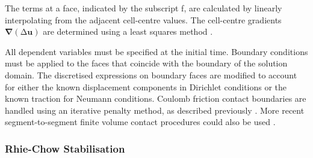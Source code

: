 \documentclass[sn-mathphys,Numbered,draft]{sn-jnl}%
\newcommand{\bb}{\boldsymbol}
\begin{document}
The terms at a face, indicated by the subscript f, are calculated by linearly interpolating from the adjacent cell-centre values. The cell-centre gradients $\bb{\nabla}\left(\mathrm{\Delta}\mathbf{u}\right)$ are determined using a least squares method \cite{noauthor_openfoam_2015}.




All dependent variables must be specified at the initial time.
Boundary conditions must be applied to the faces that coincide with the boundary of the solution domain.
The discretised expressions on boundary faces are modified to account for either the known displacement components in Dirichlet conditions or the known traction for Neumann conditions.
Coulomb friction contact boundaries are handled using an iterative penalty method, as described previously \citep{cardiff_lagrangian_2017, cardiff_development_2012}.
More recent segment-to-segment finite volume contact procedures could also be used \citep{Batistic2022, Batistic2023}.



\subsubsection{Rhie-Chow Stabilisation}
\end{document}
